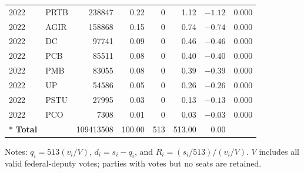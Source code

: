\begin{longtable}{@{}llrrrrrr@{}}
2022 & PRTB & 238847 & 0.22 & 0 & 1.12 & \(-1.12\) & 0.000 \\
2022 & AGIR & 158868 & 0.15 & 0 & 0.74 & \(-0.74\) & 0.000 \\
2022 & DC & 97741 & 0.09 & 0 & 0.46 & \(-0.46\) & 0.000 \\
2022 & PCB & 85511 & 0.08 & 0 & 0.40 & \(-0.40\) & 0.000 \\
2022 & PMB & 83055 & 0.08 & 0 & 0.39 & \(-0.39\) & 0.000 \\
2022 & UP & 54586 & 0.05 & 0 & 0.26 & \(-0.26\) & 0.000 \\
2022 & PSTU & 27995 & 0.03 & 0 & 0.13 & \(-0.13\) & 0.000 \\
2022 & PCO & 7308 & 0.01 & 0 & 0.03 & \(-0.03\) & 0.000 \\*
\midrule
\textbf{Total} &  & 109413508 & 100.00 & 513 & 513.00 & 0.00 &  \\
\end{longtable}
\noindent\begin{minipage}{\textwidth}
\footnotesize Notes: $q_i=513(v_i/V)$, $d_i=s_i-q_i$, and
$R_i=(s_i/513)/(v_i/V)$. $V$ includes all valid federal-deputy
votes; parties with votes but no seats are retained.
\end{minipage}\par
\endgroup
